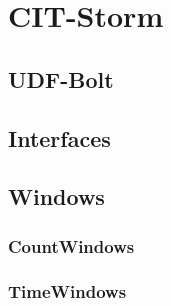 \section{CIT-Storm}

\subsection{UDF-Bolt}

\subsection{Interfaces}

\subsection{Windows}

\subsubsection{CountWindows}

\subsubsection{TimeWindows}